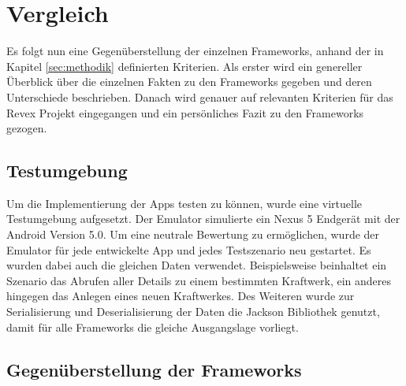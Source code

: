 \chapter{Vergleich}
\label{sec:comparison}
Es folgt nun eine Gegenüberstellung der einzelnen Frameworks, anhand der in Kapitel \ref{sec:methodik} definierten Kriterien. Als erster wird ein genereller Überblick über die einzelnen Fakten zu den Frameworks gegeben und deren Unterschiede beschrieben. Danach wird genauer auf relevanten Kriterien für das Revex Projekt eingegangen und ein persönliches Fazit zu den Frameworks gezogen.

\section{Testumgebung}
Um die Implementierung der Apps testen zu können, wurde eine virtuelle Testumgebung aufgesetzt. Der Emulator simulierte ein Nexus 5 Endgerät mit der Android Version 5.0. Um eine neutrale Bewertung zu ermöglichen, wurde der Emulator für jede entwickelte App und jedes Testszenario neu gestartet. Es wurden dabei auch die gleichen Daten verwendet. Beispielsweise beinhaltet ein Szenario das Abrufen aller Details zu einem bestimmten Kraftwerk, ein anderes hingegen das Anlegen eines neuen Kraftwerkes. Des Weiteren wurde zur Serialisierung und Deserialisierung der Daten die Jackson Bibliothek genutzt, damit für alle Frameworks die gleiche Ausgangslage vorliegt. 

\section{Gegenüberstellung der Frameworks}

